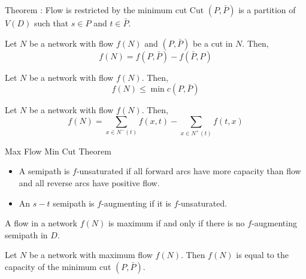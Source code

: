 \documentclass{beamer}
\begin{document}
\begin{frame}{Theorem : Flow is restricted by the minimum cut}
	Cut $(P,\bar{P})$ is a partition of $V(D)$ such that $s \in P$ and $t \in \bar{P}$.

	\begin{theorem}
		Let $N$ be a network with flow $f(N)$ and $(P,\bar{P})$ be a cut in $N$. Then,
	$$f(N) = f(P,\bar{P}) - f(\bar{P},P)$$
	\end{theorem}

	\begin{corollary}
		Let $N$ be a network with flow $f(N)$. Then,
		$$f(N) \le \min c(P,\bar{P})$$
	\end{corollary}

	\begin{corollary}
		Let $N$ be a network with flow $f(N)$. Then,
		$$f(N)  = \sum_{x \in N^-(t)} f(x,t) - \sum_{x \in N^+(t)} f(t,x) $$
	\end{corollary}
\end{frame}

\begin{frame}{Max Flow Min Cut Theorem}
	\begin{itemize}
		\item A semipath is $f$-unsaturated if all forward arcs have more capacity than flow and all reverse arcs have positive flow.
		\item An $s-t$ semipath is $f$-augmenting if it is $f$-unsaturated.
	\end{itemize}

	\begin{theorem}
		A flow in a network $f(N)$ is maximum if and only if there is no $f$-augmenting semipath in $D$.
	\end{theorem}

	\begin{theorem}
		Let $N$ be a network with maximum flow $f(N)$.
		Then $f(N)$ is equal to the capacity of the minimum cut $(P,\bar{P})$.
	\end{theorem}
\end{frame}
\end{document}
